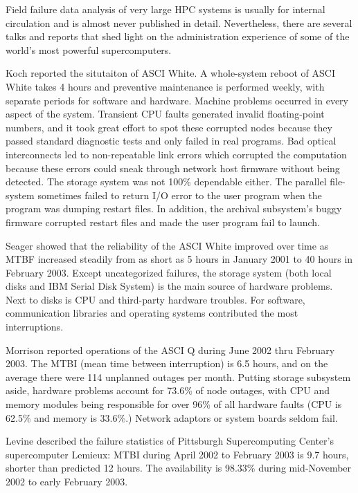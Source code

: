 \documentclass[10pt,twocolumn]{article}
\begin{document}
\label{s:rel}
Field failure data analysis of very large HPC systems
is usually for internal circulation and is almost never 
published in detail. Nevertheless, there are several talks 
and reports that shed light on the administration experience
of some of the world's most powerful supercomputers. 

Koch \cite{Koch:02} reported the situtaiton of ASCI White.
A whole-system reboot of ASCI White takes 4 hours and 
preventive maintenance is performed weekly, with separate 
periods for software and hardware. Machine problems occurred 
in every aspect of the system. Transient CPU faults 
generated invalid floating-point numbers, and it took 
great effort to spot these corrupted nodes because they passed 
standard diagnostic tests and only failed in real programs. 
Bad optical interconnects led to non-repeatable link errors 
which corrupted the computation because these errors could 
sneak through network host firmware without being detected. 
The storage system was not 100\% dependable either. 
The parallel file-system sometimes failed to return I/O error 
to the user program when the program was dumping restart files. 
In addition, the archival subsystem's buggy firmware corrupted 
restart files and made the user program fail to launch. 

Seager \cite{Seager:03} showed that the reliability of the 
ASCI White improved over time as MTBF increased steadily from 
as short as 5 hours in January 2001 to 40 hours in February 
2003. Except uncategorized failures, the storage system 
(both local disks and IBM Serial Disk System) 
is the main source of hardware problems. Next to disks is 
CPU and third-party hardware troubles. For software, 
communication libraries and operating systems contributed
the most interruptions.

Morrison \cite{Morrison:03} reported operations of the
ASCI Q during June 2002 thru February 2003. The MTBI 
(mean time between interruption) is 6.5 hours, and on 
the average there were 114 unplanned outages per month. 
Putting storage subsystem aside, hardware problems account 
for 73.6\% of node outages, with CPU and memory modules 
being responsible for over 96\% of all hardware faults 
(CPU is 62.5\% and memory is 33.6\%.) Network adaptors or 
system boards seldom fail. 

Levine \cite{Levine:03} described the failure statistics of 
Pittsburgh Supercomputing Center's supercomputer Lemieux: MTBI 
during April 2002 to February 2003 is 9.7 hours, shorter than 
predicted 12 hours. The availability is 98.33\% during 
mid-November 2002 to early February 2003.
\end{document}
